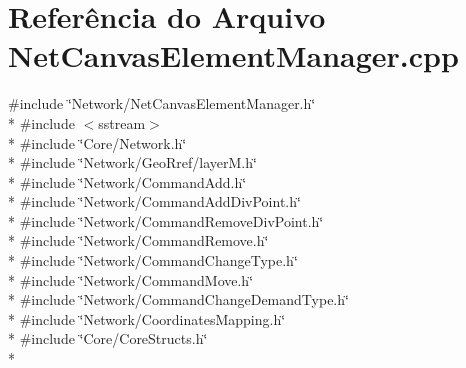 \section{Referência do Arquivo Net\+Canvas\+Element\+Manager.\+cpp}
\label{_net_canvas_element_manager_8cpp}
{\ttfamily \#include \char`\"{}Network/\+Net\+Canvas\+Element\+Manager.\+h\char`\"{}}\\*
{\ttfamily \#include $<$sstream$>$}\\*
{\ttfamily \#include \char`\"{}Core/\+Network.\+h\char`\"{}}\\*
{\ttfamily \#include \char`\"{}Network/\+Geo\+Rref/layer\+M.\+h\char`\"{}}\\*
{\ttfamily \#include \char`\"{}Network/\+Command\+Add.\+h\char`\"{}}\\*
{\ttfamily \#include \char`\"{}Network/\+Command\+Add\+Div\+Point.\+h\char`\"{}}\\*
{\ttfamily \#include \char`\"{}Network/\+Command\+Remove\+Div\+Point.\+h\char`\"{}}\\*
{\ttfamily \#include \char`\"{}Network/\+Command\+Remove.\+h\char`\"{}}\\*
{\ttfamily \#include \char`\"{}Network/\+Command\+Change\+Type.\+h\char`\"{}}\\*
{\ttfamily \#include \char`\"{}Network/\+Command\+Move.\+h\char`\"{}}\\*
{\ttfamily \#include \char`\"{}Network/\+Command\+Change\+Demand\+Type.\+h\char`\"{}}\\*
{\ttfamily \#include \char`\"{}Network/\+Coordinates\+Mapping.\+h\char`\"{}}\\*
{\ttfamily \#include \char`\"{}Core/\+Core\+Structs.\+h\char`\"{}}\\*
